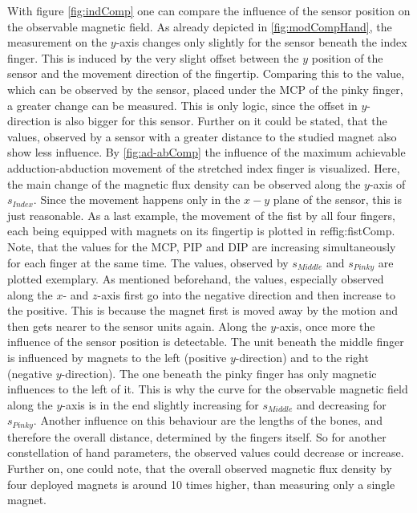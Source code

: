 With figure \ref{fig:indComp} one can compare the influence of the sensor position on the observable magnetic field. As already depicted in \ref{fig:modCompHand}, the measurement on the $ y $-axis changes only slightly for the sensor beneath the index finger. This is induced by the very slight offset between the $ y $ position of the sensor and the movement direction of the fingertip. Comparing this to the value, which can be observed by the sensor, placed under the \ac{MCP} of the pinky finger, a greater change can be measured. This is only logic, since the offset in $ y $-direction is also bigger for this sensor. Further on it could be stated, that the values, observed by a sensor with a greater distance to the studied magnet also show less influence. By \ref{fig:ad-abComp} the influence of the maximum achievable adduction-abduction movement of the stretched index finger is visualized. Here, the main change of the magnetic flux density can be observed along the $ y $-axis of $ s_{Index} $. Since the movement happens only in the $ x-y $ plane of the sensor, this is just reasonable. As a last example, the movement of the fist by all four fingers, each being equipped with magnets on its fingertip is plotted in ref{fig:fistComp}. Note, that the values for the \ac{MCP}, \ac{PIP} and \ac{DIP} are increasing simultaneously for each finger at the same time. The values, observed by $ s_{Middle} $ and $ s_{Pinky} $ are plotted exemplary. As mentioned beforehand, the values, especially observed along the $ x $- and $ z $-axis first go into the negative direction and then increase to the positive. This is because the magnet first is moved \grqq away \grqq by the motion and then gets nearer to the sensor units again. Along the $ y $-axis, once more the influence of the sensor position is detectable. The unit beneath the middle finger is influenced by magnets to the left (positive $ y $-direction) and to the right (negative $ y $-direction). The one beneath the pinky finger has only magnetic influences to the left of it. This is why the curve for the observable magnetic field along the $ y $-axis is in the end slightly increasing for $ s_{Middle} $ and decreasing for $ s_{Pinky} $. Another influence on this behaviour are the lengths of the bones, and therefore the overall distance, determined by the fingers itself. So for another constellation of hand parameters, the observed values could decrease or increase. Further on, one could note, that the overall observed magnetic flux density by four deployed magnets is around 10 times higher, than measuring only a single magnet.

